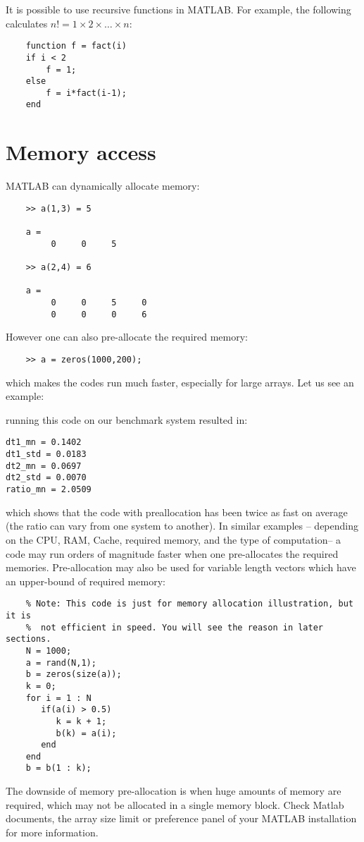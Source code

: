 \documentclass[10pt,a4paper]{article}
\newcounter{example}[section]
\begin{document}
It is possible to use recursive functions in MATLAB. For example, the following calculates $n!=1\times 2 \times \ldots \times n$:
\begin{lstlisting}
	function f = fact(i)
	if i < 2
	    f = 1;
	else
	    f = i*fact(i-1);
	end
\end{lstlisting}

\section{Memory access}
\label{sec:memory}
MATLAB can dynamically allocate memory:
\begin{lstlisting}
	>> a(1,3) = 5
	
	a =
	     0     0     5
	     
	>> a(2,4) = 6
	
	a =
	     0     0     5     0
	     0     0     0     6
\end{lstlisting}
However one can also pre-allocate the required memory:
\begin{lstlisting}
	>> a = zeros(1000,200);
\end{lstlisting}
which makes the codes run much faster, especially for large arrays. Let us see an example:



running this code on our benchmark system resulted in:
\begin{lstlisting}
dt1_mn = 0.1402
dt1_std = 0.0183
dt2_mn = 0.0697
dt2_std = 0.0070
ratio_mn = 2.0509
\end{lstlisting}
which shows that the code with preallocation has been twice as fast on average (the ratio can vary from one system to another). In similar examples -- depending on the CPU, RAM, Cache, required memory, and the type of computation-- a code may run orders of magnitude faster when one pre-allocates the required memories. Pre-allocation may also be used for variable length vectors which have an upper-bound of required memory:
\begin{lstlisting}
	% Note: This code is just for memory allocation illustration, but it is
	%  not efficient in speed. You will see the reason in later sections.
	N = 1000;
	a = rand(N,1);
	b = zeros(size(a));
	k = 0;
	for i = 1 : N
	   if(a(i) > 0.5)
	      k = k + 1;
	      b(k) = a(i);
	   end
	end
	b = b(1 : k);
\end{lstlisting}
The downside of memory pre-allocation is when huge amounts of memory are required, which may not be allocated in a single memory block. Check Matlab documents, the array size limit or preference panel of your MATLAB installation for more information.
\end{document}
